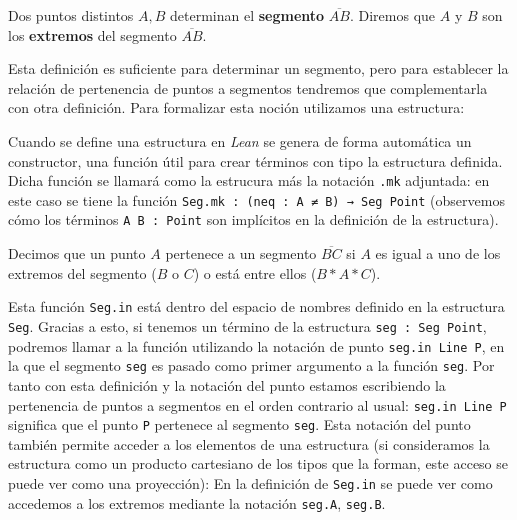 \begin{defin*}[Segmentos]
	Dos puntos distintos $A, B$ determinan el \textbf{segmento} $\overline{AB}$.
	Diremos que $A$ y $B$ son los \textbf{extremos} del segmento $\overline{AB}$.
\end{defin*}

Esta definición es suficiente para determinar un segmento, pero para establecer
la relación de pertenencia de puntos a segmentos tendremos que complementarla
con otra definición. Para formalizar esta noción utilizamos una estructura:


Cuando se define una estructura en \textit{Lean} se genera de forma automática
un constructor, una función útil para crear términos con tipo la estructura
definida. Dicha función se llamará como la estrucura más la notación
\lstinline{.mk} adjuntada: en este caso se tiene la función
\lstinline{Seg.mk : (neq : A ≠ B) → Seg Point} (observemos cómo los términos
\lstinline{A B : Point} son implícitos en la definición de la estructura).

\begin{defin*}
	Decimos que un punto $A$ pertenece a un segmento $\overline{BC}$ si $A$ es
	igual a uno de los extremos del segmento ($B$ o $C$) o está entre ellos
	($B * A * C$).
\end{defin*}


Esta función \lstinline{Seg.in} está dentro del espacio de nombres definido en
la estructura \lstinline{Seg}. Gracias a esto, si tenemos un término de la
estructura \lstinline{seg : Seg Point}, podremos llamar a la función utilizando
la notación de punto \lstinline{seg.in Line P}, en la que el segmento
\lstinline{seg} es pasado como primer argumento a la función \lstinline{seg}.
Por tanto con esta definición y la notación del punto estamos escribiendo la
pertenencia de puntos a segmentos en el orden contrario al usual:
\lstinline{seg.in Line P} significa que el punto \lstinline{P} pertenece al
segmento \lstinline{seg}. Esta notación del punto también permite acceder a los
elementos de una estructura (si consideramos la estructura como un producto
cartesiano de los tipos que la forman, este acceso se puede ver como una
proyección): En la definición de \lstinline{Seg.in} se puede ver como accedemos
a los extremos mediante la notación \lstinline{seg.A}, \lstinline{seg.B}.


